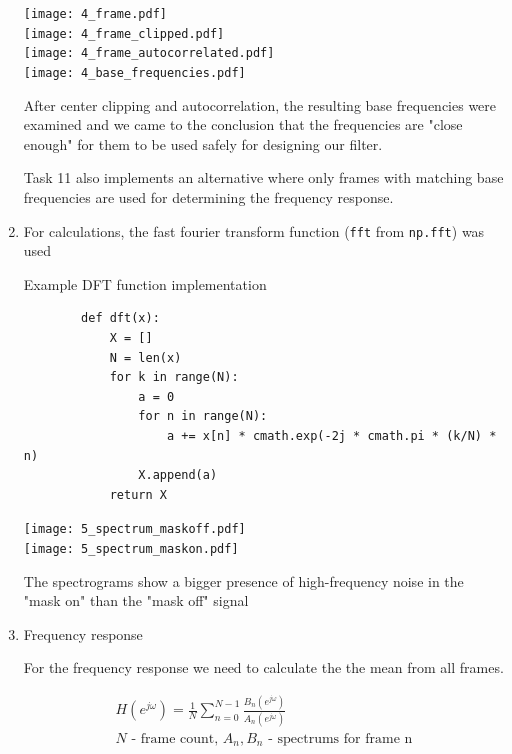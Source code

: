 \documentclass[a4paper, 11pt]{article}
\begin{document}
\begin{enumerate}
        \newpage
        \texttt{[image: 4\_frame.pdf]} \\
        \texttt{[image: 4\_frame\_clipped.pdf]} \\
        \texttt{[image: 4\_frame\_autocorrelated.pdf]} \\
        \texttt{[image: 4\_base\_frequencies.pdf]}

        After center clipping and autocorrelation, the resulting base frequencies were examined
        and we came to the conclusion that the frequencies are "close enough"
        for them to be used safely for designing our filter.

        Task 11 also implements an alternative where only frames with matching base frequencies are used for
        determining the frequency response.

        \newpage
        \item
        For calculations, the fast fourier transform function (\texttt{fft} from \texttt{np.fft}) was used

        Example DFT function implementation

        \begin{verbatim}
        def dft(x):
            X = []
            N = len(x)
            for k in range(N):
                a = 0
                for n in range(N):
                    a += x[n] * cmath.exp(-2j * cmath.pi * (k/N) * n)
                X.append(a)
            return X
        \end{verbatim}

        \texttt{[image: 5\_spectrum\_maskoff.pdf]} \\
        \texttt{[image: 5\_spectrum\_maskon.pdf]}

        The spectrograms show a bigger presence of high-frequency noise in the "mask on" than the "mask off" signal

        \newpage
        \item
        Frequency response

        For the frequency response we need to calculate the the mean from all frames.

        \begin{gather*}
            H(e^{j\omega}) = \frac{1}{N} \sum_{n=0}^{N-1} \frac{ B_n(e^{j\omega}) }{ A_n(e^{j\omega}) } \\
            N \text{ - frame count, } A_n, B_n \text{ - spectrums for frame n}
        \end{gather*}


\end{enumerate}
\end{document}
